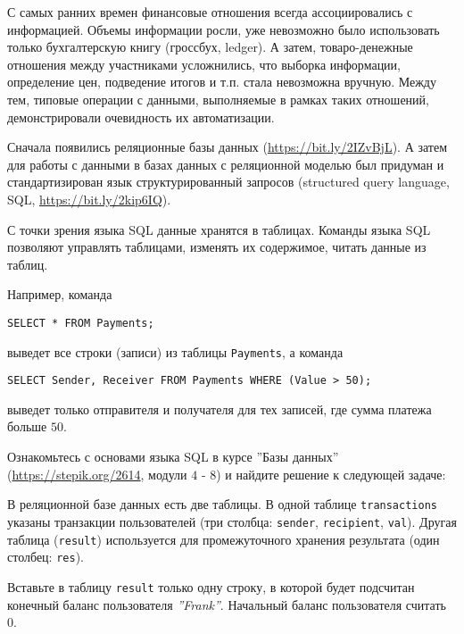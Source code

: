 
С самых ранних времен финансовые отношения всегда ассоциировались с информацией. Объемы информации росли, уже невозможно было использовать только бухгалтерскую книгу (гроссбух, ledger). А затем, товаро-денежные отношения между участниками усложнились, что выборка информации, определение цен, подведение итогов и т.п. стала невозможна вручную. Между тем, типовые операции с данными, выполняемые в рамках таких отношений, демонстрировали очевидность их автоматизации.     

Сначала появились реляционные базы данных (\url{https://bit.ly/2IZvBjL}). А затем для работы с данными в базах данных с реляционной моделью был придуман и стандартизирован язык структурированный запросов (structured query language, SQL, \url{https://bit.ly/2kip6IQ}).

С точки зрения языка SQL данные хранятся в таблицах. Команды языка SQL позволяют управлять таблицами, изменять их содержимое, читать данные из таблиц.

Например, команда

\begin{verbatim}
SELECT * FROM Payments;
\end{verbatim}

выведет все строки (записи) из таблицы \texttt{Payments}, а команда 

\begin{verbatim}
SELECT Sender, Receiver FROM Payments WHERE (Value > 50);
\end{verbatim}

выведет только отправителя и получателя для тех записей, где сумма платежа больше $50$.

Ознакомьтесь с основами языка SQL в курсе ''Базы данных'' (\url{https://stepik.org/2614}, модули $4$ - $8$) и найдите решение к следующей задаче:

В реляционной базе данных есть две таблицы. В одной таблице \texttt{transactions} указаны транзакции пользователей (три столбца: \texttt{sender}, \texttt{recipient}, \texttt{val}). Другая таблица (\texttt{result}) используется для промежуточного хранения результата (один столбец: \texttt{res}).

Вставьте в таблицу \texttt{result} только одну строку, в которой будет подсчитан конечный баланс пользователя \textit{''Frank''}. Начальный баланс пользователя считать 0.  

\commentsSection


